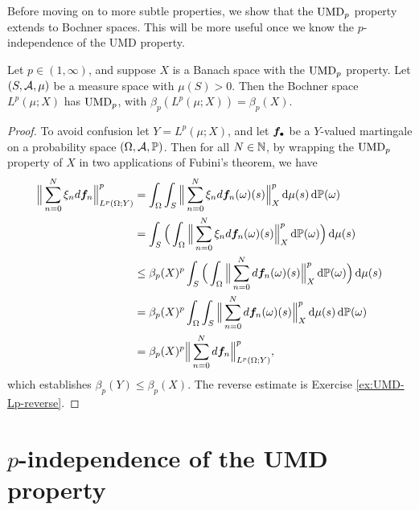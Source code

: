 Before moving on to more subtle properties, we show that the $\mathrm{UMD}_{p}$ property extends to Bochner spaces.
This will be more useful once we know the $p$-independence of the UMD property.

\begin{prop}\label{prop:Bochner-UMDp}
  Let $p \in (1,\infty)$, and suppose $X$ is a Banach space with the $\mathrm{UMD}_{p}$ property.
  Let $(S,\mathcal{A},\mu)$ be a measure space with $\mu(S) > 0$.
  Then the Bochner space $L^p(\mu;X)$ has $\mathrm{UMD}_{p}$, with $\beta_{p}(L^p(\mu;X)) = \beta_{p}(X)$.
\end{prop}

\begin{proof}
  To avoid confusion let $Y = L^p(\mu;X)$, and let $\bm{f}_{\bullet}$ be a $Y$-valued martingale on a probability space $(\Omega,\mathcal{A},\mathbb{P})$.
  Then for all $N \in \mathbb{N}$, by wrapping the $\mathrm{UMD}_{p}$ property of $X$ in two applications of Fubini's theorem, we have
  \begin{equation*}
    \begin{aligned}
      \Big\| \sum_{n=0}^N \xi_{n} d\bm{f}_{n} \Big\|_{L^p(\Omega;Y)}^{p}
      &= \int_{\Omega} \int_{S} \Big\| \sum_{n=0}^N \xi_{n} d\bm{f}_{n}(\omega)(s) \Big\|_{X}^{p} \, \mathrm{d}\mu(s) \, \mathrm{d}\mathbb{P}(\omega) \\
      &=  \int_{S} \Big( \int_{\Omega} \Big\| \sum_{n=0}^N \xi_{n} d\bm{f}_{n}(\omega)(s) \Big\|_{X}^{p}  \, \mathrm{d}\mathbb{P}(\omega) \Big) \, \mathrm{d}\mu(s) \\
      &\leq \beta_{p}(X)^{p} \int_{S} \Big( \int_{\Omega} \Big\| \sum_{n=0}^N d\bm{f}_{n}(\omega)(s) \Big\|_{X}^{p}  \, \mathrm{d}\mathbb{P}(\omega) \Big) \, \mathrm{d}\mu(s) \\
      &= \beta_{p}(X)^{p} \int_{\Omega}  \int_{S} \Big\| \sum_{n=0}^N d\bm{f}_{n}(\omega)(s) \Big\|_{X}^{p}   \, \mathrm{d}\mu(s) \, \mathrm{d}\mathbb{P}(\omega) \\
      &= \beta_{p}(X)^{p} \Big\| \sum_{n=0}^N d\bm{f}_{n} \Big\|_{L^p(\Omega;Y)}^{p},
    \end{aligned}
  \end{equation*}
  which establishes $\beta_{p}(Y) \leq \beta_{p}(X)$.
  The reverse estimate is Exercise \ref{ex:UMD-Lp-reverse}.
\end{proof}

\section{$p$-independence of the UMD property}\label{sec:UMD-p-independence}


